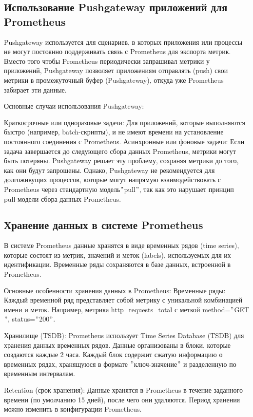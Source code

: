 \subsection{Использование Pushgateway приложений для Prometheus}

Pushgateway используется для сценариев, в которых приложения или процессы не могут постоянно поддерживать связь
с Prometheus для экспорта метрик.
Вместо того чтобы Prometheus периодически запрашивал метрики у приложений, Pushgateway позволяет приложениям отправлять
(push) свои метрики в промежуточный буфер (Pushgateway), откуда уже Prometheus забирает эти данные.

Основные случаи использования Pushgateway:

Краткосрочные или одноразовые задачи:
Для приложений, которые выполняются быстро (например, batch-скрипты), и не имеют времени на установление постоянного
соединения с Prometheus.
Асинхронные или фоновые задачи: Если задача завершается до следующего сбора данных Prometheus,
метрики могут быть потеряны.
Pushgateway решает эту проблему, сохраняя метрики до того, как они будут запрошены.
Однако, Pushgateway не рекомендуется для долгоживущих процессов, которые могут напрямую взаимодействовать
с Prometheus через стандартную модель\( "\)pull\("\), так как это нарушает принцип pull-модели сбора данных Prometheus.

\subsection{Хранение данных в системе Prometheus}

В системе Prometheus данные хранятся в виде временных рядов (time series), которые состоят из метрик, значений и меток
(labels), используемых для их идентификации.
Временные ряды сохраняются в базе данных, встроенной в Prometheus.

Основные особенности хранения данных в Prometheus:
Временные ряды: Каждый временной ряд представляет собой метрику с уникальной комбинацией имени и меток.
Например, метрика http\_requests\_total с меткой {method=\("\)GET\("\), status=\("\)200\("\)}.

Хранилище (TSDB): Prometheus использует Time Series Database (TSDB) для хранения данных временных рядов.
Данные организованы в блоки, которые создаются каждые 2 часа.
Каждый блок содержит сжатую информацию о временных рядах, хранящуюся в формате \("\)ключ-значение\("\) и
разделенную по временным интервалам.

Retention (срок хранения): Данные хранятся в Prometheus в течение заданного времени (по умолчанию 15 дней), после чего
они удаляются.
Период хранения можно изменить в конфигурации Prometheus.

